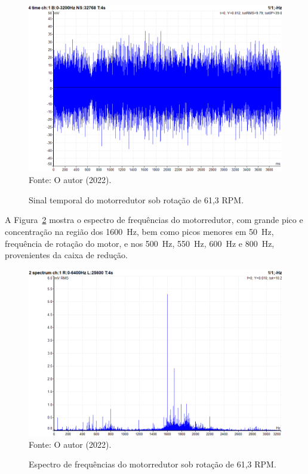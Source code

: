 \documentclass[
	12pt,				
	oneside,			
	a4paper,			
	english,			
	brazil,			
	]{abntex2ppgsi}
\begin{document}
\begin{figure}[H]
\centering
\caption {Sinal temporal do motorredutor sob rotação de 61,3 RPM.}
\includegraphics[width=\textwidth,keepaspectratio]{MOTORREDUTOR_TEMPORAL_ACELEROMETRO} \\
Fonte: O autor (2022).
\label{MOTORREDUTOR_TEMPORAL_ACELEROMETRO}
\end{figure}

A Figura~\ref{ESPECTRO_ACELERACAO_MOTORREDUTOR_100HZ} mostra o espectro de frequências do motorredutor, com grande pico e concentração na região dos \SI{1600}{\hertz}, bem como picos menores em \SI{50}{\hertz}, frequência de rotação do motor, e nos \SI{500}{\hertz}, \SI{550}{\hertz}, \SI{600}{\hertz} e \SI{800}{\hertz}, provenientes da caixa de redução. 

\begin{figure}[H]
\centering
\caption {Espectro de frequências do motorredutor sob rotação de 61,3 RPM.}
\includegraphics[width=\textwidth,keepaspectratio]{espectro_redutor_4v_mv} \\
Fonte: O autor (2022).
\label{ESPECTRO_ACELERACAO_MOTORREDUTOR_100HZ}
\end{figure}
\end{document}
